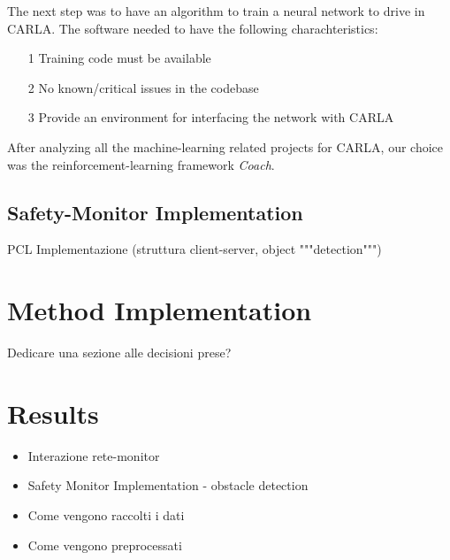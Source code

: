 The next step was to have an algorithm to train a neural network to drive in CARLA. The software needed to have the following charachteristics:

\begin{itemize}
	\item[1] Training code must be available
	\item[2] No known/critical issues in the codebase
	\item[3] Provide an environment for interfacing the network with CARLA
\end{itemize}

After analyzing all the machine-learning related projects for CARLA, our choice was the reinforcement-learning framework \textsl{Coach}.\cite{coach}

\subsection{Safety-Monitor Implementation}

PCL
Implementazione (struttura client-server, object """detection""")


\section{Method Implementation}

Dedicare una sezione alle decisioni prese?

\section{Results}

\begin{itemize}
	
	\item Interazione rete-monitor
	\item Safety Monitor Implementation - obstacle detection
	\item Come vengono raccolti i dati
	\item Come vengono preprocessati
	
\end{itemize}

